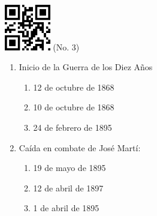 \documentclass[twocolumn]{article}
\title{}
\date{}
\begin{document}

\begin{center}
 \hspace{0.2cm}
 \includegraphics[width=2cm]{qrcode-3.png}
 \hspace{0.5cm}
 \Large{  (No. 3) }
\end{center}



\begin{enumerate}



  \item Inicio de la Guerra de los Diez Años

  \begin{enumerate}
   
   \item 12 de octubre de 1868
   
   \item 10 de octubre de 1868
   
   \item 24 de febrero de 1895
   
  \end{enumerate}



  \item Caída en combate de José Martí:

  \begin{enumerate}
   
   \item 19 de mayo de 1895
   
   \item 12 de abril de 1897
   
   \item 1 de abril de 1895
   
  \end{enumerate}


\end{enumerate}


\end{document}
